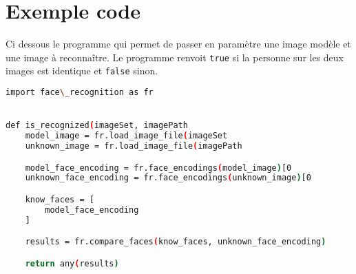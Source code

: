\section{Exemple code}
Ci dessous le programme qui permet de passer en paramètre une image modèle et
une image à reconnaître. Le programme renvoit \verb|true| si la personne sur les deux
images est identique et \verb|false| sinon.
\\
  \begin{lstlisting}[language=bash]
import face\_recognition as fr


def is_recognized(imageSet, imagePath
    model_image = fr.load_image_file(imageSet
    unknown_image = fr.load_image_file(imagePath

    model_face_encoding = fr.face_encodings(model_image)[0
    unknown_face_encoding = fr.face_encodings(unknown_image)[0

    know_faces = [
        model_face_encoding
    ]

    results = fr.compare_faces(know_faces, unknown_face_encoding)

    return any(results)
\end{lstlisting}

